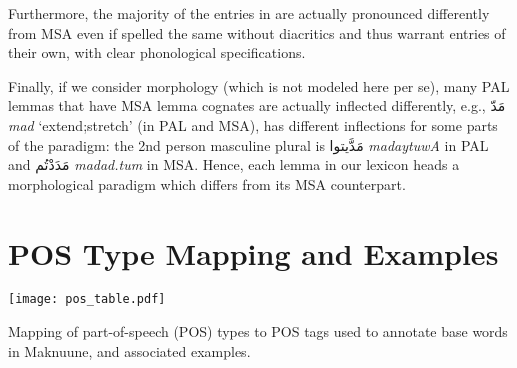 Furthermore, the majority of the entries in \maknuune are actually pronounced differently from MSA even if spelled the same without diacritics and thus warrant entries of their own, with clear phonological specifications.

Finally, if we consider morphology (which is not modeled here per se), many PAL lemmas that have MSA lemma cognates are actually inflected differently, e.g.,
\foreignlanguage{arabic}{مَدّ}
{\it mad{\SHADDA}} `extend;stretch'
(in PAL and MSA),
has different inflections for some parts of the paradigm: the 2nd person masculine plural is
\foreignlanguage{arabic}{مَدَّيتوا} {\it mad{\SHADDA}aytuwA} in PAL and
\foreignlanguage{arabic}{مَدَدْتُم} {\it madad.tum} in MSA.
Hence, each lemma in our lexicon heads a morphological paradigm which differs from its MSA counterpart.

\newpage

\section*{POS Type Mapping and Examples}
%
\label{pos-mapping}

\begin{table}[h!]
    \centering
\texttt{[image: pos\_table.pdf]}
    \caption{Mapping of part-of-speech (POS) types to POS tags used to annotate base words in Maknuune, and associated examples.}
    \label{tab:pos}
\end{table}

